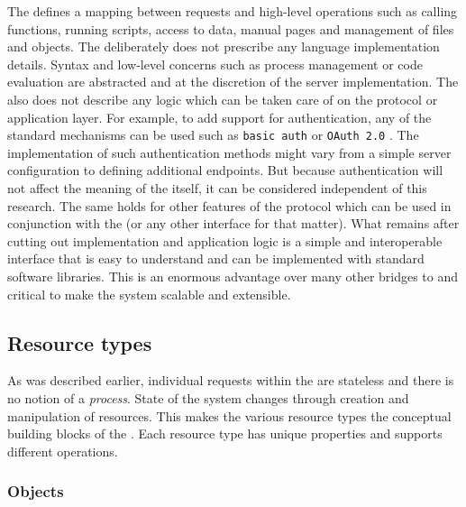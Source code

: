 The \OpenCPU \API defines a mapping between \HTTP requests and high-level operations such as calling functions, running scripts, access to data, manual pages and management of files and objects. The \API deliberately does not prescribe any language implementation details. Syntax and low-level concerns such as process management or code evaluation are abstracted and at the discretion of the server implementation. The \API also does not describe any logic which can be taken care of on the protocol or application layer. For example, to add support for authentication, any of the standard mechanisms can be used such as \texttt{basic auth} \citep{franks1999rfc} or \texttt{OAuth 2.0} \citep{hardt2012oauth}. The implementation of such authentication methods might vary from a simple server configuration to defining additional endpoints. But because authentication will not affect the meaning of the \API itself, it can be considered independent of this research. The same holds for other features of the \HTTP protocol which can be used in conjunction with the \OpenCPU \API (or any other \HTTP interface for that matter). What remains after cutting out implementation and application logic is a simple and interoperable interface that is easy to understand and can be implemented with standard \HTTP software libraries. This is an enormous advantage over many other bridges to \R and critical to make the system scalable and extensible. 

\subsection{Resource types}

As was described earlier, individual requests within the \OpenCPU \API are stateless and there is no notion of a \emph{process}. State of the system changes through creation and manipulation of resources. This makes the various resource types the conceptual building blocks of the \API. Each resource type has unique properties and supports different operations.

\subsubsection{Objects}

